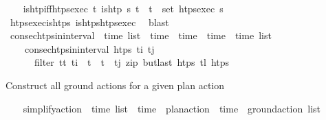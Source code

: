 \begin{isabellebody}
\isanewline
%
\endisadelimproof
\isanewline
\ \ \isamarkupfalse%
\ is{\isacharunderscore}{\kern0pt}htp{\isacharunderscore}{\kern0pt}iff{\isacharunderscore}{\kern0pt}htps{\isacharunderscore}{\kern0pt}exec{\isacharcolon}{\kern0pt}\ {\isachardoublequoteopen}{\isasymforall}t{\isachardot}{\kern0pt}\ is{\isacharunderscore}{\kern0pt}htp\ {\isasympi}s\ t\ {\isasymlongleftrightarrow}\ t\ {\isasymin}\ set\ {\isacharparenleft}{\kern0pt}htps{\isacharunderscore}{\kern0pt}exec\ {\isasympi}s{\isacharparenright}{\kern0pt}{\isachardoublequoteclose}\isanewline
%
\isadelimproof
\ \ \ \ %
\endisadelimproof
%
\isatagproof
{}\isamarkupfalse%
\ htps{\isacharunderscore}{\kern0pt}exec{\isacharunderscore}{\kern0pt}is{\isacharunderscore}{\kern0pt}htps\ is{\isacharunderscore}{\kern0pt}htps{\isacharunderscore}{\kern0pt}htps{\isacharunderscore}{\kern0pt}exec\ \isamarkupfalse%
\ blast%
\endisatagproof
{\isafoldproof}%
%
\isadelimproof
\isanewline
%
\endisadelimproof
\isanewline
\ \ \isamarkupfalse%
\ consec{\isacharunderscore}{\kern0pt}htps{\isacharunderscore}{\kern0pt}in{\isacharunderscore}{\kern0pt}interval\ {\isacharcolon}{\kern0pt}{\isacharcolon}{\kern0pt}\ {\isachardoublequoteopen}time\ list\ {\isasymRightarrow}\ time\ {\isasymRightarrow}\ time\ {\isasymRightarrow}\ {\isacharparenleft}{\kern0pt}time\ {\isasymtimes}\ time{\isacharparenright}{\kern0pt}\ list{\isachardoublequoteclose}\ \ \isanewline
\ \ \ \ {\isachardoublequoteopen}consec{\isacharunderscore}{\kern0pt}htps{\isacharunderscore}{\kern0pt}in{\isacharunderscore}{\kern0pt}interval\ htps\ t\isactrlsub i\ t\isactrlsub j\ {\isacharequal}{\kern0pt}\ \isanewline
\ \ \ \ \ \ filter\ {\isacharparenleft}{\kern0pt}{\isasymlambda}{\isacharparenleft}{\kern0pt}t{\isacharcomma}{\kern0pt}t{\isacharprime}{\kern0pt}{\isacharparenright}{\kern0pt}{\isachardot}{\kern0pt}\ t\isactrlsub i\ {\isasymle}\ t\ {\isasymand}\ t{\isacharprime}{\kern0pt}\ {\isasymle}\ t\isactrlsub j{\isacharparenright}{\kern0pt}\ {\isacharparenleft}{\kern0pt}zip\ {\isacharparenleft}{\kern0pt}butlast\ htps{\isacharparenright}{\kern0pt}\ {\isacharparenleft}{\kern0pt}tl\ htps{\isacharparenright}{\kern0pt}{\isacharparenright}{\kern0pt}{\isachardoublequoteclose}%
\begin{isamarkuptext}%
Construct all ground actions for a given plan action%
\end{isamarkuptext}\isamarkuptrue%
\ \ \isamarkupfalse%
\ simplify{\isacharunderscore}{\kern0pt}action\ {\isacharcolon}{\kern0pt}{\isacharcolon}{\kern0pt}\ {\isachardoublequoteopen}time\ list\ {\isasymRightarrow}\ {\isacharparenleft}{\kern0pt}time\ {\isasymtimes}\ plan{\isacharunderscore}{\kern0pt}action{\isacharparenright}{\kern0pt}\ {\isasymRightarrow}\ {\isacharparenleft}{\kern0pt}time\ {\isasymtimes}\ ground{\isacharunderscore}{\kern0pt}action{\isacharparenright}{\kern0pt}\ list{\isachardoublequoteclose}\ \isanewline

\end{isabellebody}
